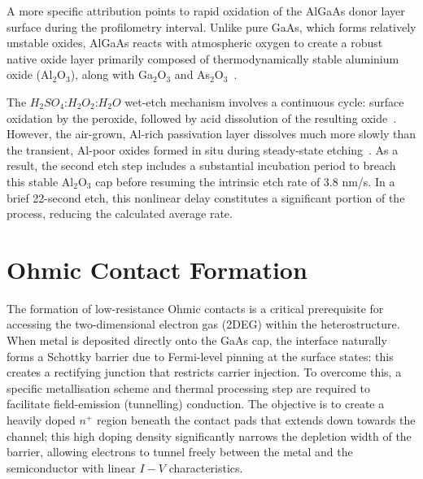 \vspace{1mm}

A more specific attribution points to rapid oxidation of the AlGaAs donor layer 
surface during the profilometry interval. Unlike pure GaAs, which forms 
relatively unstable oxides, AlGaAs reacts with atmospheric oxygen to create a 
robust native oxide layer primarily composed of thermodynamically stable 
aluminium oxide (Al$_2$O$_3$), along with Ga$_2$O$_3$ and 
As$_2$O$_3$~\cite{Passlack, bessolov1998chalcogenide}.

\vspace{2mm}

The $H_2SO_4$:$H_2O_2$:$H_2O$ wet-etch mechanism involves a continuous cycle: 
surface oxidation by the peroxide, followed by acid dissolution of the resulting 
oxide~\cite{notten1991mechanism}. However, the air-grown, Al-rich passivation 
layer dissolves much more slowly than the transient, Al-poor oxides formed in 
situ during steady-state etching~\cite{bessolov1998chalcogenide}. As a result, 
the second etch step includes a substantial incubation period to breach this 
stable Al$_2$O$_3$ cap before resuming the intrinsic etch rate of 3.8 nm/s. In 
a brief 22-second etch, this nonlinear delay constitutes a significant portion 
of the process, reducing the calculated average rate.
\label{subsection:AlGaAs_oxidation}
\section{Ohmic Contact Formation}

The formation of low-resistance Ohmic contacts is a critical prerequisite for 
accessing the two-dimensional electron gas (2DEG) within the heterostructure. 
When metal is deposited directly onto the GaAs cap, the interface naturally 
forms a Schottky barrier due to Fermi-level pinning at the surface states: 
this creates a rectifying junction that restricts carrier injection. To 
overcome this, a specific metallisation scheme and thermal processing step are 
required to facilitate field-emission (tunnelling) conduction. The objective 
is to create a heavily doped $n^{+}$ region beneath the contact pads that 
extends down towards the channel; this high doping density significantly 
narrows the depletion width of the barrier, allowing electrons to tunnel 
freely between the metal and the semiconductor with linear $I-V$ 
characteristics.

\vspace{1mm}

